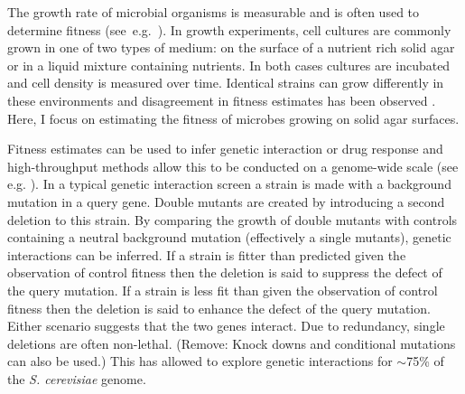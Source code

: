 
The growth rate of microbial organisms is measurable and is often used
to determine fitness (see~e.g.~\citet{Addinall2011}). In growth
experiments, cell cultures are commonly grown in one of two types of
medium: on the surface of a nutrient rich solid agar or in a liquid
mixture containing nutrients. In both cases cultures are incubated and
cell density is measured over time. Identical strains can grow
differently in these environments and disagreement in fitness
estimates has been observed \citet{Baryshnikova2010}. Here, I focus on
estimating the fitness of microbes growing on solid agar surfaces.



Fitness estimates can be used to infer genetic interaction or drug
response and high-throughput methods allow this to be conducted on a
genome-wide scale (see e.g. \citet{Costanzo2010,Andrew2013}). In a
typical genetic interaction screen a strain is made with a background
mutation in a query gene. Double mutants are created by introducing a
second deletion to this strain. By comparing the growth of double
mutants with controls containing a neutral background mutation
(effectively a single mutants), genetic interactions can be
inferred. If a strain is fitter than predicted given the observation
of control fitness then the deletion is said to suppress the defect of
the query mutation. If a strain is less fit than given the observation
of control fitness then the deletion is said to enhance the defect of
the query mutation. Either scenario suggests that the two genes
interact. Due to redundancy, single deletions are often
non-lethal. (Remove: Knock downs and conditional mutations can also be
used.) This has allowed \citet{Costanzo2010} to explore genetic
interactions for \(\sim\)75\% of the \textit{S. cerevisiae} genome.


